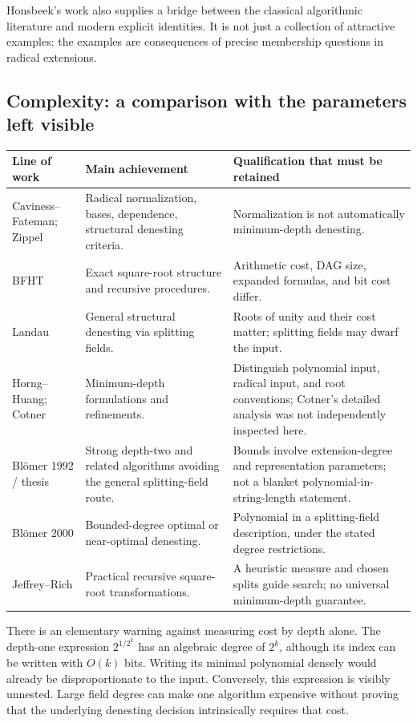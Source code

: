 \documentclass[11pt,a4paper]{article}
\theoremstyle{definition}
\theoremstyle{remark}
\numberwithin{equation}{section}
\begin{document}
Honsbeek's work also supplies a bridge between the classical algorithmic literature and modern explicit identities. It is not just a collection of attractive examples: the examples are consequences of precise membership questions in radical extensions.

\subsection{Complexity: a comparison with the parameters left visible}

\begin{longtable}{P{0.20\textwidth}P{0.35\textwidth}P{0.38\textwidth}}
\toprule
Line of work & Main achievement & Qualification that must be retained \\
\midrule
\endhead
Caviness--Fateman; Zippel & Radical normalization, bases, dependence, structural denesting criteria. & Normalization is not automatically minimum-depth denesting.\\
BFHT & Exact square-root structure and recursive procedures. & Arithmetic cost, DAG size, expanded formulas, and bit cost differ.\\
Landau & General structural denesting via splitting fields. & Roots of unity and their cost matter; splitting fields may dwarf the input.\\
Horng--Huang; Cotner & Minimum-depth formulations and refinements. & Distinguish polynomial input, radical input, and root conventions; Cotner's detailed analysis was not independently inspected here.\\
Bl\"omer 1992 / thesis & Strong depth-two and related algorithms avoiding the general splitting-field route. & Bounds involve extension-degree and representation parameters; not a blanket polynomial-in-string-length statement.\\
Bl\"omer 2000 & Bounded-degree optimal or near-optimal denesting. & Polynomial in a splitting-field description, under the stated degree restrictions.\\
Jeffrey--Rich & Practical recursive square-root transformations. & A heuristic measure and chosen splits guide search; no universal minimum-depth guarantee.\\
\bottomrule
\end{longtable}

There is an elementary warning against measuring cost by depth alone. The depth-one expression $2^{1/2^k}$ has an algebraic degree of $2^k$, although its index can be written with $O(k)$ bits. Writing its minimal polynomial densely would already be disproportionate to the input. Conversely, this expression is visibly unnested. Large field degree can make one algorithm expensive without proving that the underlying denesting decision intrinsically requires that cost.
\end{document}
